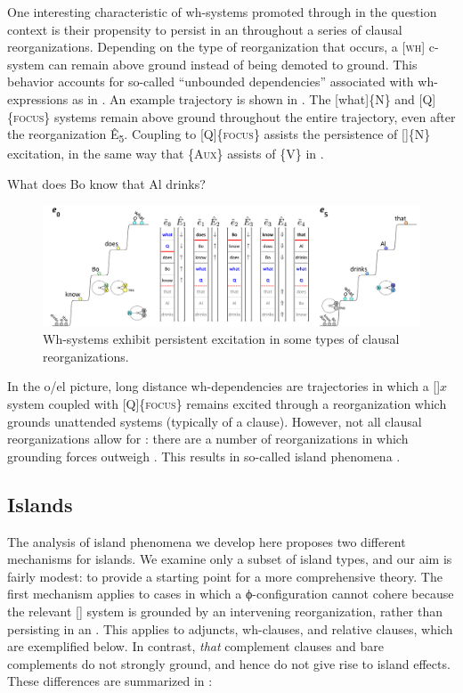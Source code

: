   One interesting characteristic of wh-systems promoted through  in the question context is their propensity to persist in an  throughout a series of clausal reorganizations. Depending on the type of reorganization that occurs, a [\textsc{wh}] c-system can remain above ground instead of being demoted to ground. This behavior accounts for so-called “unbounded dependencies” associated with wh-expressions as in . An example trajectory is shown in {}. The [what]\{N\} and [Q]\{\textsc{focus}\} systems remain above ground throughout the entire trajectory, even after the  reorganization Ê\textsubscript{5}. Coupling to [Q]\{\textsc{focus}\} assists the persistence of []\{N\} excitation, in the same way that \{A\textsc{ux}\} assists  of \{V\} in . 

  \ea\label{ex:7:20}
    {What does Bo know that Al drinks?}
\z
  
\begin{figure}
\includegraphics[width=\textwidth]{figures/Tilsen-img162.png}
\caption{Wh-systems exhibit persistent excitation in some types of clausal reorganizations.}
\label{fig:7:18}
\end{figure}
 

  In the o/el picture, long distance wh-dependencies are trajectories in which a []{$x$} system coupled with [Q]\{\textsc{focus}\} remains excited through a reorganization which grounds unattended systems (typically of a clause). However, not all clausal reorganizations allow for : there are a number of reorganizations in which grounding forces outweigh . This results in so-called island phenomena \citep{Ross1967}.

\subsection{Islands}

The analysis of island phenomena we develop here proposes two different mechanisms for islands. We examine only a subset of island types, and our aim is fairly modest: to provide a starting point for a more comprehensive theory. The first mechanism applies to cases in which a ϕ-con\-fig\-u\-ra\-tion cannot cohere because the relevant [] system is grounded by an intervening reorganization, rather than persisting in an . This applies to adjuncts, wh-clauses, and relative clauses, which are exemplified below. In contrast, \textit{that} complement clauses and bare complements do not strongly ground, and hence do not give rise to island effects. These differences are summarized in {}:

